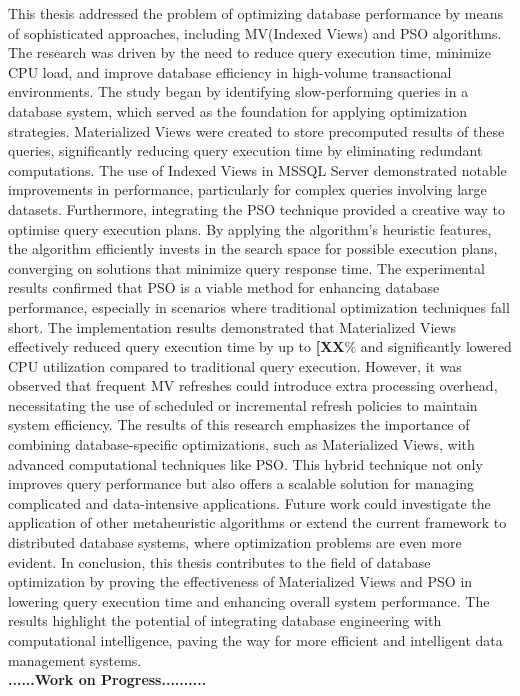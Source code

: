 This thesis addressed the problem of optimizing database performance by means of sophisticated approaches, including MV(Indexed Views) and PSO algorithms. The research was driven by the need to reduce query execution time, minimize CPU load, and improve database efficiency in high-volume transactional environments. The study began by identifying slow-performing queries in a database system, which served as the foundation for applying optimization strategies. Materialized Views were created to store precomputed results of these queries, significantly reducing query execution time by eliminating redundant computations. The use of Indexed Views in MSSQL Server demonstrated notable improvements in performance, particularly for complex queries involving large datasets.
Furthermore, integrating the PSO technique provided a creative way to optimise query execution plans. By applying the algorithm's heuristic features, the algorithm efficiently invests in the search space for possible execution plans, converging on solutions that minimize query response time. The experimental results confirmed that PSO is a viable method for enhancing database performance, especially in scenarios where traditional optimization techniques fall short.
The implementation results demonstrated that Materialized Views effectively reduced query execution time by up to \textbf{[XX}\% and significantly lowered CPU utilization compared to traditional query execution. However, it was observed that frequent MV refreshes could introduce extra processing overhead, necessitating the use of scheduled or incremental refresh policies to maintain system efficiency.
The results of this research emphasizes the importance of combining database-specific optimizations, such as Materialized Views, with advanced computational techniques like PSO. This hybrid technique not only improves query performance but also offers a scalable solution for managing complicated and data-intensive applications. Future work could investigate the application of other metaheuristic algorithms or extend the current framework to distributed database systems, where optimization problems are even more evident.
In conclusion, this thesis contributes to the field of database optimization by proving the effectiveness of Materialized Views and PSO in lowering query execution time and enhancing overall system performance. The results highlight the potential of integrating database engineering with computational intelligence, paving the way for more efficient and intelligent data management systems.\\
\textbf{......\textbf{Work on Progress}..........}       